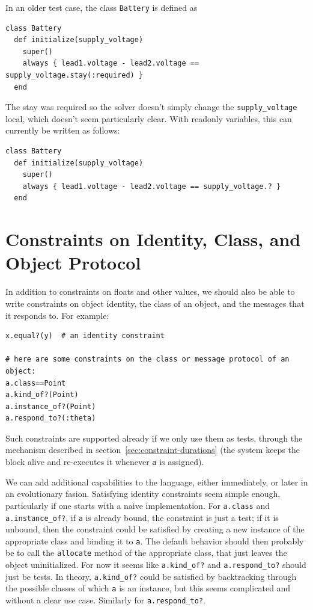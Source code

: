 \documentclass[11pt]{article}
\begin{document}
In an older test case, the class \lstinline{Battery} is defined as
\begin{lstlisting}
class Battery
  def initialize(supply_voltage)
    super()
    always { lead1.voltage - lead2.voltage == supply_voltage.stay(:required) }
  end
\end{lstlisting}

The stay was required so the solver doesn't simply change the
\lstinline{supply_voltage} local, which doesn't seem particularly
clear. With readonly variables, this can currently be written as
follows:

\begin{lstlisting}
class Battery
  def initialize(supply_voltage)
    super()
    always { lead1.voltage - lead2.voltage == supply_voltage.? }
  end
\end{lstlisting}

\section{Constraints on Identity, Class, and Object Protocol}

In addition to constraints on floats and other values, we should also
be able to write constraints on object identity, the class of an
object, and the messages that it responds to.  For example:

\begin{lstlisting}
x.equal?(y)  # an identity constraint

# here are some constraints on the class or message protocol of an object:
a.class==Point  
a.kind_of?(Point)
a.instance_of?(Point)
a.respond_to?(:theta)
\end{lstlisting}

Such constraints are supported already if we only use them as tests,
through the mechanism described in
section~\ref{sec:constraint-durations} (the system keeps the block
alive and re-executes it whenever \lstinline{a} is assigned).

We can add additional capabilities to the language, either
immediately, or later in an evolutionary fasion.  Satisfying identity
constraints seem simple enough, particularly if one starts with a
naive implementation.  For \lstinline{a.class} and
\lstinline{a.instance_of?}, if \lstinline{a} is already bound, the
constraint is just a test; if it is unbound, then the constraint could
be satisfied by creating a new instance of the appropriate class and
binding it to \lstinline{a}. The default behavior should then probably
be to call the \lstinline{allocate} method of the appropriate class,
that just leaves the object uninitialized. For now it seems like
\lstinline{a.kind_of?}  and \lstinline{a.respond_to?} should just be
tests.  In theory, \lstinline{a.kind_of?} could be satisfied by
backtracking through the possible classes of which \lstinline{a} is an
instance, but this seems complicated and without a clear use case.
Similarly for \lstinline{a.respond_to?}.
\end{document}
